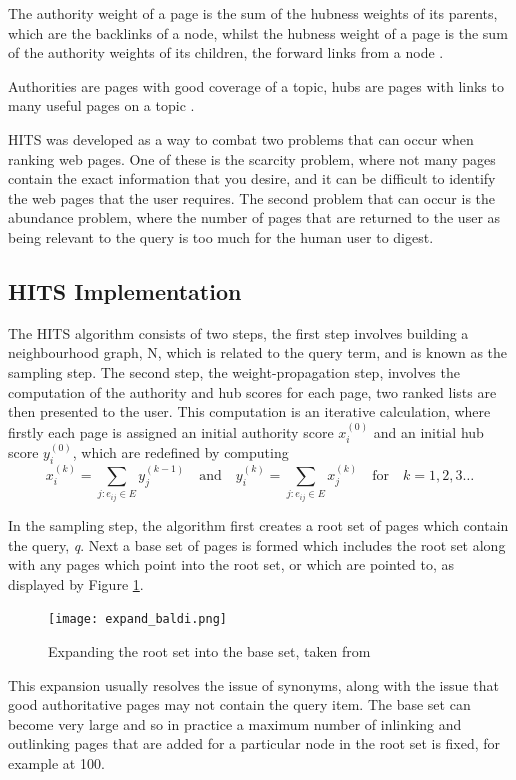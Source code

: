 \documentclass[11pt]{report}
\begin{document}
The authority weight of a page is the sum of the hubness weights of its parents, which are the backlinks of a node, whilst the hubness weight of a page is the sum of the authority weights of its children, the forward links from a node \cite{baldi2003modeling}.

{Authorities are pages with good coverage of a topic, hubs are pages with links to many useful pages on a topic \cite{bonato}.} 

HITS was developed as a way to combat two problems that can occur when ranking web pages. One of these is the scarcity problem, where not many pages contain the exact information that you desire, and it can be difficult to identify the web pages that the user requires. The second problem that can occur is the abundance problem, where the number of pages that are returned to the user as being relevant to the query is too much for the human user to digest. 



\subsection{HITS Implementation} \label{sec:HITS implementation}
The HITS algorithm consists of two steps, the first step involves building a neighbourhood graph, N, which is related to the query term, and is known as the sampling step. The second step, the weight-propagation step, involves the computation of the authority and hub scores for each page, two ranked lists are then presented to the user. This computation is an iterative calculation, where firstly each page is assigned an initial authority score $x_i^{(0)}$ and an initial hub score $y_i^{(0)}$, which are redefined by computing \begin{equation} \label{eq:HITS1}
x_i^{(k)} = \displaystyle \sum_{j:e_{ij}\in E} y_j^{(k-1)} \quad\mathrm{and}\quad y_i^{(k)} = \displaystyle \sum_{j:e_{ij}\in E} x_j^{(k)}  \quad\mathrm{for}\quad k=1,2,3\ldots
\end{equation} 

In the sampling step, the algorithm first creates a root set of pages which contain the query, \textit{q}. Next a base set of pages is formed which includes the root set along with any pages which point into the root set, or which are pointed to, as displayed by Figure \ref{fig:HITS expanding}. 
\begin{figure}[h]
\centering
\texttt{[image: expand\_baldi.png]}
\caption{Expanding the root set into the base set, taken from \cite{baldi2003modeling}}
\label{fig:HITS expanding}
\end{figure}
This expansion usually resolves the issue of synonyms, along with the issue that good authoritative pages may not contain the query item. The base set can become very large and so in practice a maximum number of inlinking and outlinking pages that are added for a particular node in the root set is fixed, for example at 100. 
\end{document}
